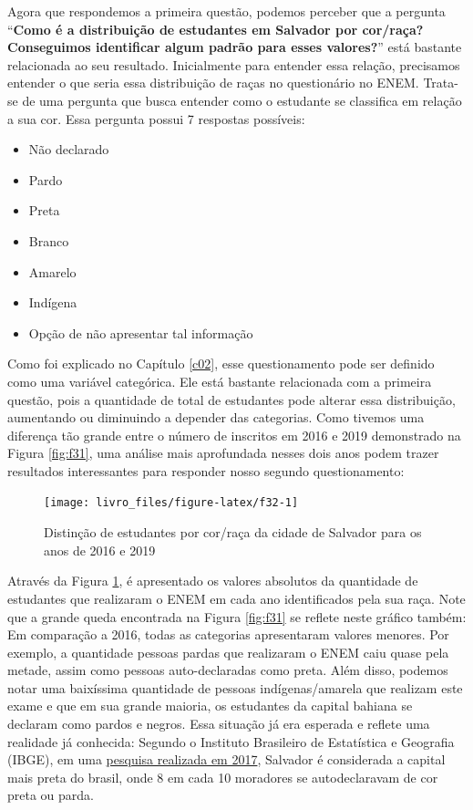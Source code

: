 \documentclass[
]{book}
\begin{document}
Agora que respondemos a primeira questão, podemos perceber que a pergunta ``\textbf{Como é a distribuição de estudantes em Salvador por cor/raça? Conseguimos identificar algum padrão para esses valores?}'' está bastante relacionada ao seu resultado.
Inicialmente para entender essa relação, precisamos entender o que seria essa distribuição de raças no questionário no ENEM. Trata-se de uma pergunta que busca entender como o estudante se classifica em relação a sua cor. Essa pergunta possui 7 respostas possíveis:

\begin{itemize}
\item
  Não declarado
\item
  Pardo
\item
  Preta
\item
  Branco
\item
  Amarelo
\item
  Indígena
\item
  Opção de não apresentar tal informação
\end{itemize}

Como foi explicado no Capítulo \ref{c02}, esse questionamento pode ser definido como uma variável categórica. Ele está bastante relacionada com a primeira questão, pois a quantidade de total de estudantes pode alterar essa distribuição, aumentando ou diminuindo a depender das categorias. Como tivemos uma diferença tão grande entre o número de inscritos em 2016 e 2019 demonstrado na Figura \ref{fig:f31}, uma análise mais aprofundada nesses dois anos podem trazer resultados interessantes para responder nosso segundo questionamento:

\begin{figure}

{\centering \texttt{[image: livro\_files/figure-latex/f32-1]} 

}

\caption{Distinção de estudantes por cor/raça da cidade de Salvador para os anos de 2016 e 2019}\label{fig:f32}
\end{figure}

Através da Figura \ref{fig:f32}, é apresentado os valores absolutos da quantidade de estudantes que realizaram o ENEM em cada ano identificados pela sua raça. Note que a grande queda encontrada na Figura \ref{fig:f31} se reflete neste gráfico também: Em comparação a 2016, todas as categorias apresentaram valores menores. Por exemplo, a quantidade pessoas pardas que realizaram o ENEM caiu quase pela metade, assim como pessoas auto-declaradas como preta. Além disso, podemos notar uma baixíssima quantidade de pessoas indígenas/amarela que realizam este exame e que em sua grande maioria, os estudantes da capital bahiana se declaram como pardos e negros. Essa situação já era esperada e reflete uma realidade já conhecida: Segundo o Instituto Brasileiro de Estatística e Geografia (IBGE), em uma \href{https://www.acordacidade.com.br/noticias/203087/ibge-ba-salvador-a-capital-mais-negra-do-brasil-e-com-a-maior-desigualdade-salarial-entre-brancos-e-pretos.html?mobile=true}{pesquisa realizada em 2017}, Salvador é considerada a capital mais preta do brasil, onde 8 em cada 10 moradores se autodeclaravam de cor preta ou parda.
\end{document}
